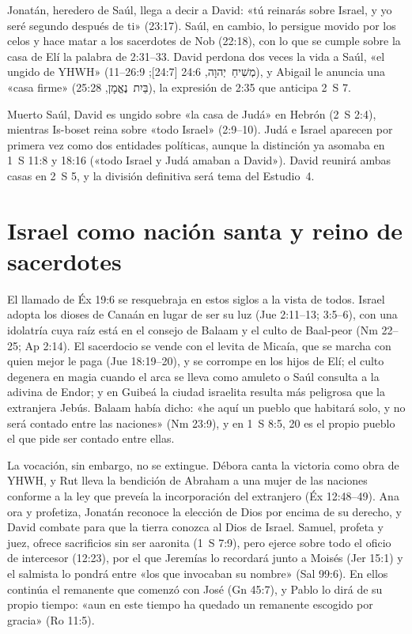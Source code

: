 \documentclass[11pt,letterpaper]{article}
\newcommand{\heb}[1]{\mbox{\foreignlanguage{hebrew}{#1}}}
\begin{document}
Jonatán, heredero de Saúl, llega a decir a David: «tú reinarás sobre Israel, y yo seré segundo después de ti» (23:17). Saúl, en cambio, lo persigue movido por los celos y hace matar a los sacerdotes de Nob (22:18), con lo que se cumple sobre la casa de Elí la palabra de 2:31--33. David perdona dos veces la vida a Saúl, «el ungido de YHWH» (\heb{מְשִׁיחַ יְהוָה}, 24:6 [24:7]; 26:9--11), y Abigail le anuncia una «casa firme» (\heb{בַּיִת נֶאֱמָן}, 25:28), la expresión de 2:35 que anticipa 2~S 7.

Muerto Saúl, David es ungido sobre «la casa de Judá» en Hebrón (2~S 2:4), mientras Is-boset reina sobre «todo Israel» (2:9--10). Judá e Israel aparecen por primera vez como dos entidades políticas, aunque la distinción ya asomaba en 1~S 11:8 y 18:16 («todo Israel y Judá amaban a David»). David reunirá ambas casas en 2~S 5, y la división definitiva será tema del Estudio~4.

\section{Israel como nación santa y reino de sacerdotes}

El llamado de Éx 19:6 se resquebraja en estos siglos a la vista de todos. Israel adopta los dioses de Canaán en lugar de ser su luz (Jue 2:11--13; 3:5--6), con una idolatría cuya raíz está en el consejo de Balaam y el culto de Baal-peor (Nm 22--25; Ap 2:14). El sacerdocio se vende con el levita de Micaía, que se marcha con quien mejor le paga (Jue 18:19--20), y se corrompe en los hijos de Elí; el culto degenera en magia cuando el arca se lleva como amuleto o Saúl consulta a la adivina de Endor; y en Guibeá la ciudad israelita resulta más peligrosa que la extranjera Jebús. Balaam había dicho: «he aquí un pueblo que habitará solo, y no será contado entre las naciones» (Nm 23:9), y en 1~S 8:5, 20 es el propio pueblo el que pide ser contado entre ellas.

La vocación, sin embargo, no se extingue. Débora canta la victoria como obra de YHWH, y Rut lleva la bendición de Abraham a una mujer de las naciones conforme a la ley que preveía la incorporación del extranjero (Éx 12:48--49). Ana ora y profetiza, Jonatán reconoce la elección de Dios por encima de su derecho, y David combate para que la tierra conozca al Dios de Israel. Samuel, profeta y juez, ofrece sacrificios sin ser aaronita (1~S 7:9), pero ejerce sobre todo el oficio de intercesor (12:23), por el que Jeremías lo recordará junto a Moisés (Jer 15:1) y el salmista lo pondrá entre «los que invocaban su nombre» (Sal 99:6). En ellos continúa el remanente que comenzó con José (Gn 45:7), y Pablo lo dirá de su propio tiempo: «aun en este tiempo ha quedado un remanente escogido por gracia» (Ro 11:5).
\end{document}

